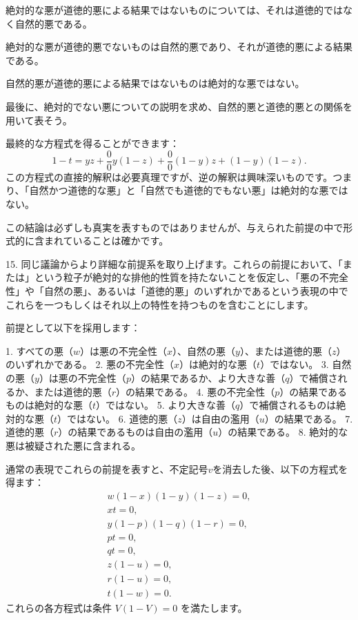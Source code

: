 \documentclass[a4paper,11pt,openany]{ltjsbook}
\begin{document}
絶対的な悪が道徳的悪による結果ではないものについては、それは道徳的ではなく自然的悪である。

絶対的な悪が道徳的悪でないものは自然的悪であり、それが道徳的悪による結果である。

自然的悪が道徳的悪による結果ではないものは絶対的な悪ではない。

最後に、絶対的でない悪についての説明を求め、自然的悪と道徳的悪との関係を用いて表そう。

最終的な方程式を得ることができます：
\[
1 - t = yz + \frac{0}{0}y(1-z) + \frac{0}{0}(1-y)z + (1-y)(1-z).
\]
この方程式の直接的解釈は必要真理ですが、逆の解釈は興味深いものです。つまり、「自然かつ道徳的な悪」と「自然でも道徳的でもない悪」は絶対的な悪ではない。

この結論は必ずしも真実を表すものではありませんが、与えられた前提の中で形式的に含まれていることは確かです。

15. 同じ議論からより詳細な前提系を取り上げます。これらの前提において、「または」という粒子が絶対的な排他的性質を持たないことを仮定し、「悪の不完全性」や「自然の悪」、あるいは「道徳的悪」のいずれかであるという表現の中でこれらを一つもしくはそれ以上の特性を持つものを含むことにします。

前提として以下を採用します：

1. すべての悪（$w$）は悪の不完全性（$x$）、自然の悪（$y$）、または道徳的悪（$z$）のいずれかである。
2. 悪の不完全性（$x$）は絶対的な悪（$t$）ではない。
3. 自然の悪（$y$）は悪の不完全性（$p$）の結果であるか、より大きな善（$q$）で補償されるか、または道徳的悪（$r$）の結果である。
4. 悪の不完全性（$p$）の結果であるものは絶対的な悪（$t$）ではない。
5. より大きな善（$q$）で補償されるものは絶対的な悪（$t$）ではない。
6. 道徳的悪（$z$）は自由の濫用（$u$）の結果である。
7. 道徳的悪（$r$）の結果であるものは自由の濫用（$u$）の結果である。
8. 絶対的な悪は被疑された悪に含まれる。

通常の表現でこれらの前提を表すと、不定記号$v$を消去した後、以下の方程式を得ます：
\begin{gather*}
w(1-x)(1-y)(1-z) = 0, \tag{1} \\
xt = 0,                \tag{2} \\
y(1-p)(1-q)(1-r) = 0, \tag{3} \\
pt = 0,                \tag{4} \\
qt = 0,                \tag{5} \\
z(1-u) = 0,            \tag{6} \\
r(1-u) = 0,            \tag{7} \\
t(1-w) = 0.            \tag{8}
\end{gather*}
これらの各方程式は条件 $V(1-V) = 0$ を満たします。
\end{document}
